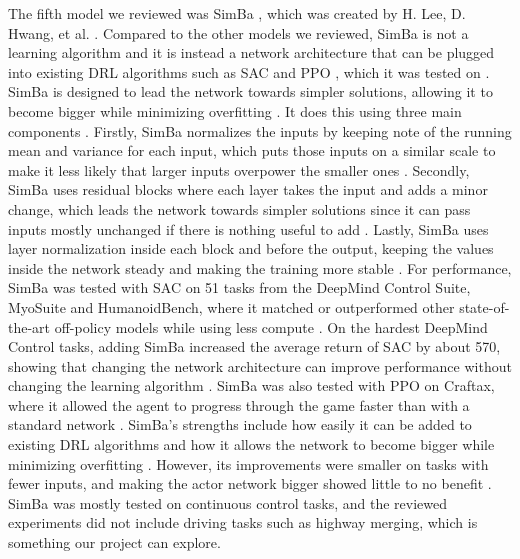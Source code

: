 \documentclass[conference]{IEEEtran}
\begin{document}
The fifth model we reviewed was SimBa \cite{b12}, which was created by H. Lee, D. Hwang, et al. \cite{b12}.
Compared to the other models we reviewed, SimBa is not a learning algorithm and it is instead a network
architecture that can be plugged into existing DRL algorithms such as SAC \cite{b3} and PPO \cite{b2}, which it was
tested on \cite{b12}. SimBa is designed to lead the network towards simpler solutions, allowing it to become bigger
while minimizing overfitting \cite{b12}. It does this using three main components \cite{b12}. Firstly, SimBa
normalizes the inputs by keeping note of the running mean and variance for each input, which puts those inputs on a
similar scale to make it less likely that larger inputs overpower the smaller ones \cite{b12}. Secondly, SimBa uses
residual blocks where each layer takes the input and adds a minor change, which leads the network towards simpler
solutions since it can pass inputs mostly unchanged if there is nothing useful to add \cite{b12}. Lastly, SimBa
uses layer normalization inside each block and before the output, keeping the values inside the network steady and
making the training more stable \cite{b12}. For performance, SimBa was tested with SAC on 51 tasks from the
DeepMind Control Suite, MyoSuite and HumanoidBench, where it matched or outperformed other state-of-the-art
off-policy models while using less compute \cite{b12}. On the hardest DeepMind Control tasks, adding SimBa
increased the average return of SAC by about 570, showing that changing the network architecture can improve
performance without changing the learning algorithm \cite{b12}. SimBa was also tested with PPO on Craftax, where it
allowed the agent to progress through the game faster than with a standard network \cite{b12}. SimBa's strengths
include how easily it can be added to existing DRL algorithms and how it allows the network to become bigger while
minimizing overfitting \cite{b12}. However, its improvements were smaller on tasks with fewer inputs, and making
the actor network bigger showed little to no benefit \cite{b12}. SimBa was mostly tested on continuous control
tasks, and the reviewed experiments did not include driving tasks such as highway merging, which is something our
project can explore.
\end{document}
